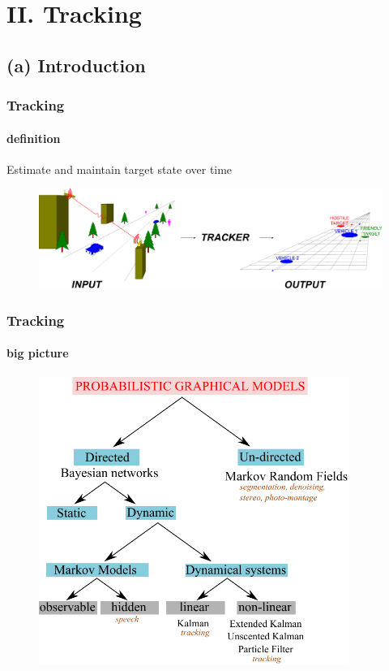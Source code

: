 \section{II. Tracking}
\subsection{(a) Introduction}
\begin{frame}
\frametitle{Tracking}
\framesubtitle{definition}
\logoCSIPCPL\mypagenum
	Estimate and maintain {\color{red}target state} over {\color{red}time}
	\begin{figure}
		\includegraphics[width=1.0\textwidth]{thesis/TRK_overviewDiagram.pdf}
	\end{figure}
\end{frame}



\begin{frame}
\frametitle{Tracking}
\framesubtitle{big picture}
\logoCSIPCPL\mypagenum
	\begin{figure}
		\includegraphics[width=0.9\textwidth]{thesis/PRML_PGM_overview.pdf}
	\end{figure}
\end{frame}





